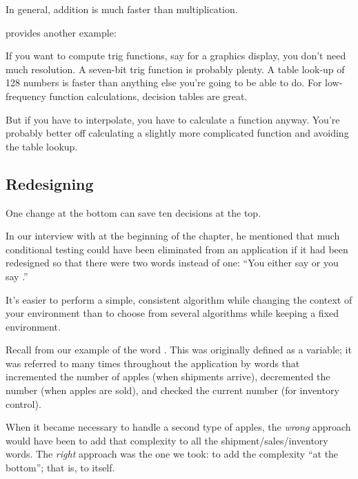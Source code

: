 In general, addition is much faster than multiplication.

\begin{interview}
 provides another example:
\begin{tfquot}
If you want to compute trig functions, say for a graphics display, you don't
need much resolution. A seven-bit trig function is probably plenty. A table
look-up of 128 numbers is faster than anything else you're going to be able
to do. For low-frequency function calculations, decision tables are great.

But if you have to interpolate, you have to calculate a function anyway.
You're probably better off calculating a slightly more complicated function
and avoiding the table lookup.
\end{tfquot}
\end{interview}%
%

\subsection{Redesigning}%

\begin{tip}
One change at the bottom can save ten decisions at the top.
\end{tip}
In our interview with  at
the beginning of the chapter, he mentioned
that much conditional testing could have been eliminated from an
application if it had been redesigned so that there were two words instead
of one: ``You either say  or you say .''

It's easier to perform a simple, consistent algorithm while changing
the context of your environment than to choose from several algorithms
while keeping a fixed environment.

Recall from  our example of the word . This
was originally defined as a variable; it was referred to many times
throughout the application by words that incremented the number of
apples (when shipments arrive), decremented the number (when apples are
sold), and checked the current number (for inventory control).

When it became necessary to handle a second type of apples, the
\emph{wrong} approach would have been to add that complexity to all
the shipment/\hy sales/\hy inventory words. The \emph{right} approach
was the one we took: to add the complexity ``at the bottom''; that is,
to  itself.

